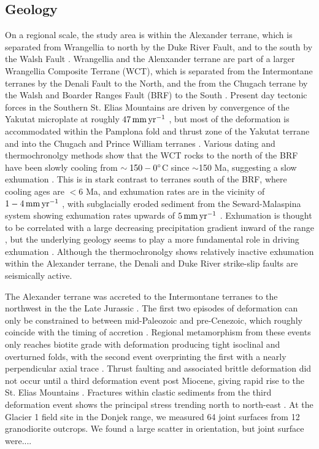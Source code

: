 \documentclass[review]{igs}
\begin{document}
\subsection{Geology}
On a regional scale, the study area is within the Alexander terrane, which is separated from Wrangellia to north by the Duke River Fault, and to the south by the Walsh Fault \citep[e.g.][]{Campbell1978,Israel2007,Wheeler1963}. Wrangellia and the Alenxander terrane are part of a larger Wrangellia Composite Terrane (WCT), which is separated from the Intermontane terranes by the Denali Fault to the North, and the from the Chugach terrane by the Walsh and Boarder Ranges Fault (BRF) to the South \citep[e.g.][]{Campbell1982,Plafker1987}. Present day tectonic forces in the Southern St. Elias Mountains are driven by convergence of the Yakutat microplate at roughly $\rm 47\,mm\,yr^{-1}$ \citep[e.g.][]{Elliott2013,Fletcher2003,Plafker1978}, but most of the deformation is accommodated within the Pamplona fold and thrust zone of the Yakutat terrane \citep[e.g.][]{Worthington2008} and into the Chugach and Prince William terranes \citep[e.g][]{Fletcher2003}. Various dating and thermochronolgy methods show that the WCT rocks to the north of the BRF have been slowly cooling from $\rm \sim150\--0^{\circ}$C since $\sim$150 Ma, suggesting a slow exhumation \citep[e.g.][]{Berger2008,Dodds1988,Enkelmann2017}. This is in stark contrast to terranes south of the BRF, where cooling ages are $<6$ Ma, and exhumation rates are in the vicinity of $\rm 1\--4\,mm\,yr^{-1}$ \citep[e.g.][]{Berger2008,Enkelmann2008,OSullivan1997}, with subglacially eroded sediment from the Seward-Malaspina system showing exhumation rates upwards of $\rm 5\,mm\,yr^{-1}$ \citep{Enkelmann2009}. Exhumation is thought to be correlated with a large decreasing precipitation gradient inward of the range \citep[e.g.][]{Berger2008}, but the underlying geology seems to play a more fundamental role in driving exhumation \citep{Enkelmann2017}. Although the thermochronolgy shows relatively inactive exhumation within the Alexander terrane, the Denali and Duke River strike-slip faults are seismically active.

The Alexander terrane was accreted to the Intermontane terranes to the northwest in the the Late Jurassic \citep{Heyden1992}. The first two episodes of deformation can only be constrained to between mid-Paleozoic and pre-Cenezoic, which roughly coincide with the timing of accretion \citep{Campbell1978}. Regional metamorphism from these events only reaches biotite grade with deformation producing tight isoclinal and overturned folds, with the second event overprinting the first with a nearly perpendicular axial trace \citep{Campbell1978}. Thrust faulting and associated brittle deformation did not occur until a third deformation event post Miocene, giving rapid rise to the St. Elias Mountains \citep[e.g.][]{Eisbacher1977,Campbell1978}. Fractures within clastic sediments from the third deformation event shows the principal stress trending north to north-east \citep{Eisbacher1977}. At the Glacier 1 field site in the Donjek range, we measured 64 joint surfaces from 12 granodiorite outcrops. We found a large scatter in orientation, but joint surface were.... 
\end{document}
